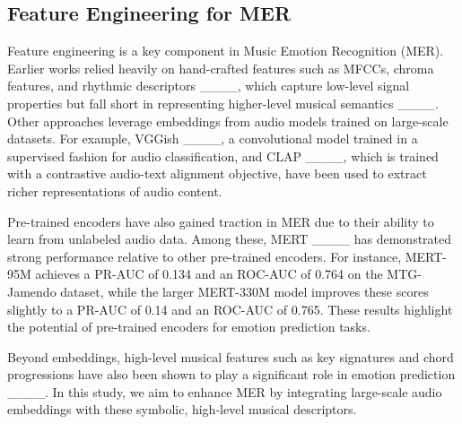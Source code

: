 \subsection{Feature Engineering for MER}

Feature engineering is a key component in Music Emotion Recognition (MER). Earlier works relied heavily on hand-crafted features such as MFCCs, chroma features, and rhythmic descriptors ____, which capture low-level signal properties but fall short in representing higher-level musical semantics ____. Other approaches leverage embeddings from audio models trained on large-scale datasets. For example, VGGish ____, a convolutional model trained in a supervised fashion for audio classification, and CLAP ____, which is trained with a contrastive audio-text alignment objective, have been used to extract richer representations of audio content.

Pre-trained encoders have also gained traction in MER due to their ability to learn from unlabeled audio data. Among these, MERT ____ has demonstrated strong performance relative to other pre-trained encoders. For instance, MERT-95M achieves a PR-AUC of 0.134 and an ROC-AUC of 0.764 on the MTG-Jamendo dataset, while the larger MERT-330M model improves these scores slightly to a PR-AUC of 0.14 and an ROC-AUC of 0.765. These results highlight the potential of pre-trained encoders for emotion prediction tasks.

Beyond embeddings, high-level musical features such as key signatures and chord progressions have also been shown to play a significant role in emotion prediction ____. In this study, we aim to enhance MER by integrating large-scale audio embeddings with these symbolic, high-level musical descriptors.


